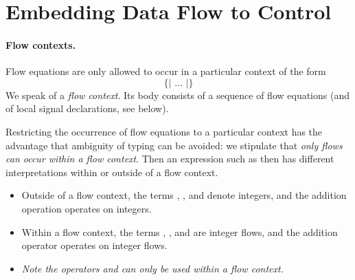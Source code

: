 \section{Embedding Data Flow to Control}\label{embedding}

\paragraph{Flow contexts.}
Flow equations are only allowed to occur in a particular context of the form
$$\texttt{\{| \ldots\  |\}}$$
We speak of a \emph{flow context}. Its body consists of a sequence of
flow equations (and of local signal declarations, see below).

Restricting the occurrence of flow equations to a particular context has the advantage that ambiguity of typing can be avoided: we stipulate that 
\emph{only flows can occur within a flow context}.
 Then an expression such as  
then has different interpretations within or outside of a flow context.
\begin{itemize}
\item Outside of a flow context, the terms , , and  denote integers, and the addition operation operates on integers.

\item Within a flow context, the terms , , and  are integer flows, and the addition operator operates on integer flows.

\item \emph{Note the operators  and \pp{->} can only be used within a flow context.}
\end{itemize}

